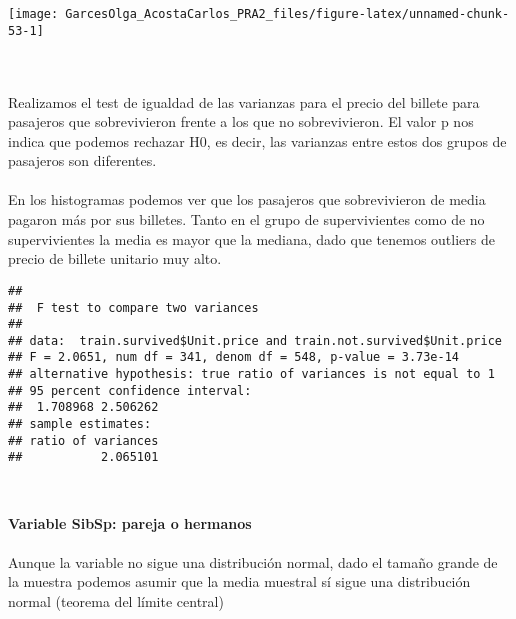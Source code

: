 \documentclass[
]{article}
\newenvironment{Shaded}{\begin{snugshade}}{\end{snugshade}}
\newcommand{\KeywordTok}[1]{\textcolor[rgb]{0.13,0.29,0.53}{\textbf{#1}}}
\newcommand{\NormalTok}[1]{#1}
\newcommand{\OperatorTok}[1]{\textcolor[rgb]{0.81,0.36,0.00}{\textbf{#1}}}
\newcommand{\StringTok}[1]{\textcolor[rgb]{0.31,0.60,0.02}{#1}}
\begin{document}
\begin{center}\texttt{[image: GarcesOlga\_AcostaCarlos\_PRA2\_files/figure-latex/unnamed-chunk-53-1]} \end{center}

\texttt{}~\\
\texttt{}~\\
Realizamos el test de igualdad de las varianzas para el precio del
billete para pasajeros que sobrevivieron frente a los que no
sobrevivieron. El valor p nos indica que podemos rechazar H0, es decir,
las varianzas entre estos dos grupos de pasajeros son diferentes.\\
\texttt{}~\\
En los histogramas podemos ver que los pasajeros que sobrevivieron de
media pagaron más por sus billetes. Tanto en el grupo de supervivientes
como de no supervivientes la media es mayor que la mediana, dado que
tenemos outliers de precio de billete unitario muy alto.\\
\texttt{}

\begin{Shaded}
\end{Shaded}

\begin{verbatim}
## 
##  F test to compare two variances
## 
## data:  train.survived$Unit.price and train.not.survived$Unit.price
## F = 2.0651, num df = 341, denom df = 548, p-value = 3.73e-14
## alternative hypothesis: true ratio of variances is not equal to 1
## 95 percent confidence interval:
##  1.708968 2.506262
## sample estimates:
## ratio of variances 
##           2.065101
\end{verbatim}

\texttt{}~\\
\texttt{}

\textbf{Variable SibSp: pareja o hermanos}\\
\texttt{}~\\
Aunque la variable no sigue una distribución normal, dado el tamaño
grande de la muestra podemos asumir que la media muestral sí sigue una
distribución normal (teorema del límite central) \texttt{}

\begin{Shaded}
\end{Shaded}
\end{document}
